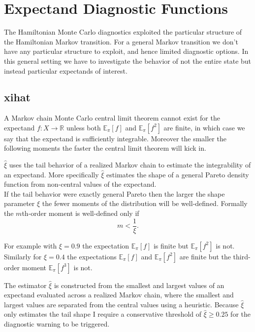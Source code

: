 \documentclass[
  letterpaper,
  DIV=11,
  numbers=noendperiod]{scrartcl}
\begin{document}
\section{Expectand Diagnostic
Functions}\label{expectand-diagnostic-functions}

The Hamiltonian Monte Carlo diagnostics exploited the particular
structure of the Hamiltonian Markov transition. For a general Markov
transition we don't have any particular structure to exploit, and hence
limited diagnostic options. In this general setting we have to
investigate the behavior of not the entire state but instead particular
expectands of interest.

\subsection{xihat}\label{xihat}

A Markov chain Monte Carlo central limit theorem cannot exist for the
expectand \(f : X \rightarrow \mathbb{R}\) unless both
\(\mathbb{E}_{\pi}[f]\) and \(\mathbb{E}_{\pi}[f^{2}]\) are finite, in
which case we say that the expectand is sufficiently integrable.
Moreover the smaller the following moments the faster the central limit
theorem will kick in.

\(\hat{\xi}\) uses the tail behavior of a realized Markov chain to
estimate the integrability of an expectand. More specifically
\(\hat{\xi}\) estimates the shape of a general Pareto density function
from non-central values of the expectand.\\
If the tail behavior were exactly general Pareto then the larger the
shape parameter \(\xi\) the fewer moments of the distribution will be
well-defined. Formally the \(m\)th-order moment is well-defined only if
\[
m < \frac{1}{\xi}.
\]

For example with \(\xi = 0.9\) the expectation \(\mathbb{E}_{\pi}[f]\)
is finite but \(\mathbb{E}_{\pi}[f^{2}]\) is not. Similarly for
\(\xi = 0.4\) the expectations \(\mathbb{E}_{\pi}[f]\) and
\(\mathbb{E}_{\pi}[f^{2}]\) are finite but the third-order moment
\(\mathbb{E}_{\pi}[f^{3}]\) is not.

The estimator \(\hat{\xi}\) is constructed from the smallest and largest
values of an expectand evaluated across a realized Markov chain, where
the smallest and largest values are separated from the central values
using a heuristic. Because \(\hat{\xi}\) only estimates the tail shape I
require a conservative threshold of \(\hat{\xi} \ge 0.25\) for the
diagnostic warning to be triggered.
\end{document}
